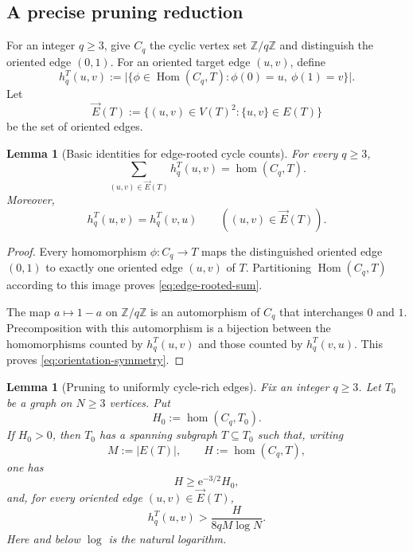 \documentclass[11pt]{article}
\newtheorem{lemma}[theorem]{Lemma}
\newcommand{\Hom}{\operatorname{Hom}}
\newcommand{\homn}{\operatorname{hom}}
\newcommand{\1}{\mathbf{1}}
\newcommand{\e}{\mathrm{e}}
\begin{document}
\subsection{A precise pruning reduction}
\label{sec:pruning}

For an integer $q\ge3$, give $C_q$ the cyclic vertex set
$\mathbb{Z}/q\mathbb{Z}$ and distinguish the oriented edge $(0,1)$.  For an
oriented target edge $(u,v)$, define
\[
  h_q^T(u,v)
  :=
  \bigl|\{\phi\in\Hom(C_q,T):\phi(0)=u,\ \phi(1)=v\}\bigr|.
  \tag{7.2}\label{eq:rooted-edge-count}
\]
Let
\[
  \vec E(T):=\{(u,v)\in V(T)^2:\{u,v\}\in E(T)\}
\]
be the set of oriented edges.

\begin{lemma}[Basic identities for edge-rooted cycle counts]
\label{lem:edge-rooted-identities}
For every $q\ge3$,
\[
  \sum_{(u,v)\in\vec E(T)}h_q^T(u,v)=\homn(C_q,T).
  \tag{7.3}\label{eq:edge-rooted-sum}
\]
Moreover,
\[
  h_q^T(u,v)=h_q^T(v,u)
  \qquad((u,v)\in\vec E(T)).
  \tag{7.4}\label{eq:orientation-symmetry}
\]
\end{lemma}

\begin{proof}
Every homomorphism $\phi:C_q\to T$ maps the distinguished oriented edge
$(0,1)$ to exactly one oriented edge $(u,v)$ of $T$.  Partitioning
$\Hom(C_q,T)$ according to this image proves
\eqref{eq:edge-rooted-sum}.

The map $a\mapsto1-a$ on $\mathbb{Z}/q\mathbb{Z}$ is an automorphism of $C_q$
that interchanges $0$ and $1$.  Precomposition with this automorphism is a
bijection between the homomorphisms counted by $h_q^T(u,v)$ and those counted
by $h_q^T(v,u)$.  This proves \eqref{eq:orientation-symmetry}.
\end{proof}

\begin{lemma}[Pruning to uniformly cycle-rich edges]
\label{lem:pruning}
Fix an integer $q\ge3$.  Let $T_0$ be a graph on $N\ge3$ vertices.  Put
\[
  H_0:=\homn(C_q,T_0).
\]
If $H_0>0$, then $T_0$ has a spanning subgraph $T\subseteq T_0$ such that,
writing
\[
  M:=|E(T)|,
  \qquad
  H:=\homn(C_q,T),
\]
one has
\[
  H\ge \e^{-3/2}H_0,
  \tag{7.5}\label{eq:pruning-preservation}
\]
and, for every oriented edge $(u,v)\in\vec E(T)$,
\[
  h_q^T(u,v)
  >
  \frac{H}{8qM\log N}.
  \tag{7.6}\label{eq:uniform-rooted-edge}
\]
Here and below $\log$ is the natural logarithm.
\end{lemma}
\end{document}
